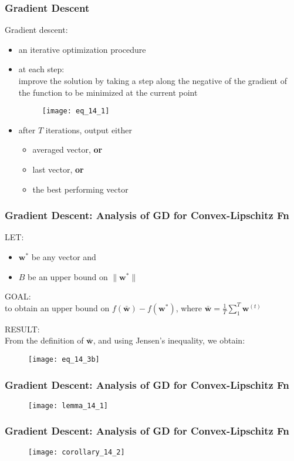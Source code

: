 \begin{frame}
\frametitle{Gradient Descent}
Gradient descent:
\begin{itemize}
\item an iterative optimization procedure
\item at each step: \\
    improve the solution by
    taking a step along the negative of the gradient of the function to be minimized at the current point

    \begin{figure}
    \centering
    \texttt{[image: eq\_14\_1]}
    \end{figure}
\item after $T$ iterations, output either
    \begin{itemize}
        \item averaged vector, \textbf{or}
        \item last vector, \textbf{or}
        \item the best performing vector
    \end{itemize}
\end{itemize}

\end{frame}

\begin{frame}
\frametitle{Gradient Descent: Analysis of GD for Convex-Lipschitz Fn}

LET:
\begin{itemize}
\item $\mathbf{w^*}$ be any vector and
\item $B$ be an upper bound on $\parallel \mathbf{w^*} \parallel$
\end{itemize}
\vspace{3mm}

GOAL:\\
to obtain an upper bound on  $f(\bar{\mathbf{w}}) - f(\mathbf{w^*})$,
where $\bar{\mathbf{w}} = \frac{1}{T} \sum_{1}^{T} \mathbf{w}^{(t)}$
\vspace{3mm}

RESULT:\\
From the definition of $\bar{\mathbf{w}}$, and using Jensen's inequality, we obtain:
\begin{figure}
    \centering
    \texttt{[image: eq\_14\_3b]}
\end{figure}

\end{frame}

\begin{frame}
\frametitle{Gradient Descent: Analysis of GD for Convex-Lipschitz Fn}

\begin{figure}
    \centering
    \texttt{[image: lemma\_14\_1]}
\end{figure}

\end{frame}

\begin{frame}
\frametitle{Gradient Descent: Analysis of GD for Convex-Lipschitz Fn}

\begin{figure}
    \centering
    \texttt{[image: corollary\_14\_2]}
\end{figure}

\end{frame}
